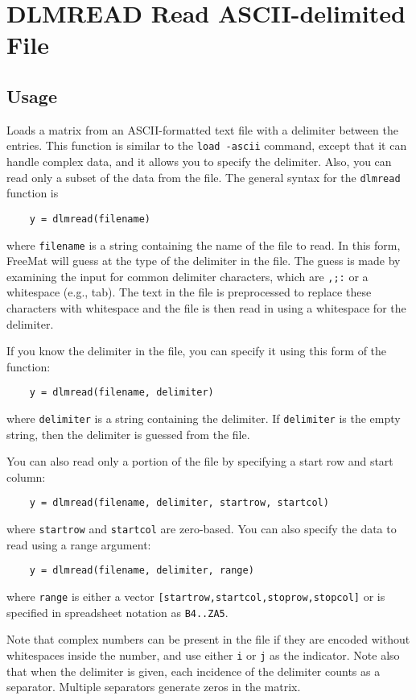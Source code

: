 \section{DLMREAD Read ASCII-delimited File}

\subsection{Usage}

Loads a matrix from an ASCII-formatted text file with a delimiter
between the entries.  This function is similar to the \verb|load -ascii|
command, except that it can handle complex data, and it allows you
to specify the delimiter.  Also, you can read only a subset of the
data from the file.  The general syntax for the \verb|dlmread| function
is
\begin{verbatim}
    y = dlmread(filename)
\end{verbatim}
where \verb|filename| is a string containing the name of the file to read.
In this form, FreeMat will guess at the type of the delimiter in the 
file.  The guess is made by examining the input for common delimiter
characters, which are \verb|,;:| or a whitespace (e.g., tab).  The text
in the file is preprocessed to replace these characters with whitespace
and the file is then read in using a whitespace for the delimiter.

If you know the delimiter in the file, you can specify it using
this form of the function:
\begin{verbatim}
    y = dlmread(filename, delimiter)
\end{verbatim}
where \verb|delimiter| is a string containing the delimiter.  If \verb|delimiter|
is the empty string, then the delimiter is guessed from the file.

You can also read only a portion of the file by specifying a start row
and start column:
\begin{verbatim}
    y = dlmread(filename, delimiter, startrow, startcol)
\end{verbatim}
where \verb|startrow| and \verb|startcol| are zero-based.  You can also specify
the data to read using a range argument:
\begin{verbatim}
    y = dlmread(filename, delimiter, range)
\end{verbatim}
where \verb|range| is either a vector \verb|[startrow,startcol,stoprow,stopcol]|
or is specified in spreadsheet notation as \verb|B4..ZA5|.

Note that complex numbers can be present in the file if they are encoded
without whitespaces inside the number, and use either \verb|i| or \verb|j| as 
the indicator.  Note also that when the delimiter is given, each incidence
of the delimiter counts as a separator.  Multiple separators generate
zeros in the matrix.
